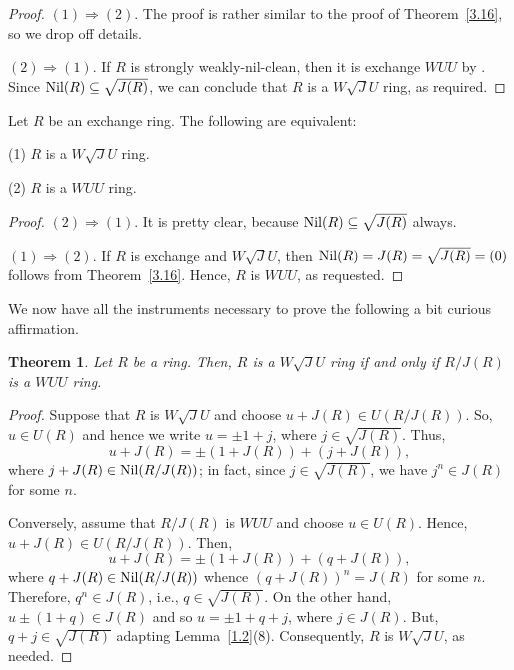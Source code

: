 \documentclass[12pt]{amsart}
\newtheorem{theorem}{Theorem}[section] \newtheorem{mtheorem}[theorem]{Main Theorem}
\begin{document}
\begin{proof} \((1) \Rightarrow (2)\). The proof is rather similar to the proof of Theorem~\ref{3.16}, so we drop off details. 	

\((2) \Rightarrow (1)\). If \( R \) is strongly weakly-nil-clean, then it is exchange $WUU$ by
\cite[Corollary 2.15]{wuu}. Since ${\rm Nil}(R)\subseteq \sqrt{J(R)}$, we can conclude that $R$ is a $W\sqrt{J}U$ ring, as required.
\end{proof}

\begin{corollary}\label{3.19} Let \( R \) be an exchange ring. The following are equivalent:

(1) \( R \) is a $W\sqrt{J}U$ ring.

(2) \( R \) is a $WUU$ ring.
\end{corollary}

\begin{proof} \((2) \Rightarrow (1)\). It is pretty clear, because ${\rm Nil}(R)\subseteq \sqrt{J(R)}$ always.

\((1) \Rightarrow (2)\). If \( R \) is exchange and $W\sqrt{J}U$, then ${\rm Nil}(R)=J(R)=\sqrt{J(R)}=(0)$ follows from Theorem~\ref{3.16}. Hence, $R$ is $WUU$, as requested.
\end{proof}

We now have all the instruments necessary to prove the following a bit curious affirmation.

\begin{theorem}\label{m} Let $R$ be a ring. Then, $R$ is a $W\sqrt{J}U$ ring if and only if $R/J(R)$ is a
$WUU$ ring.
\end{theorem}

\begin{proof} Suppose that $R$ is $W\sqrt{J}U$ and choose $u+J(R)\in U(R/J(R))$. So, $u\in U(R)$ and hence we write $u=\pm 1+j$, where $j\in \sqrt{J(R)}$. Thus, $$u+J(R)=\pm (1+J(R)) + (j+J(R)),$$ where $j+J(R)\in
{\rm Nil}(R/J(R))$; in fact, since $j\in \sqrt{J(R)}$, we have $j^n\in J(R)$ for some $n$.

Conversely, assume that $R/J(R)$ is $WUU$ and choose $u\in U(R)$. Hence, $u+J(R)\in U(R/J(R))$. Then, $$u+J(R)=\pm(1+J(R))+(q+J(R)),$$ where $q+J(R)\in {\rm Nil}(R/J(R))$ whence $(q+J(R))^n=J(R)$ for some $n$. Therefore, $q^n\in J(R)$, i.e., $q\in \sqrt{J(R)}$. On the other hand, $u\pm(1+q)\in J(R)$ and so $u=\pm1+q+j$, where $j\in J(R)$. But, $q+j\in \sqrt{J(R)}$ adapting Lemma~\ref {1.2}(8). Consequently, $R$ is $W\sqrt{J}U$, as needed.
\end{proof}
\end{document}
